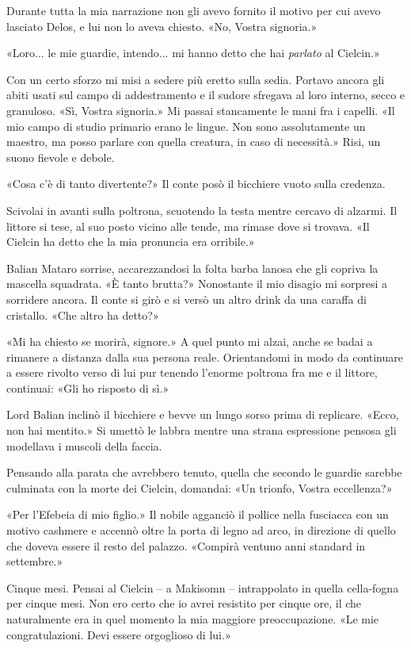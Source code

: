 Durante tutta la mia narrazione non gli avevo fornito il motivo per cui
avevo lasciato Delos, e lui non lo aveva chiesto. «No, Vostra signoria.»

«Loro... le mie guardie, intendo... mi hanno detto che hai
\emph{parlato} al Cielcin.»

Con un certo sforzo mi misi a sedere più eretto sulla sedia. Portavo
ancora gli abiti usati sul campo di addestramento e il sudore sfregava
al loro interno, secco e granuloso. «Sì, Vostra signoria.» Mi passai
stancamente le mani fra i capelli. «Il mio campo di studio primario
erano le lingue. Non sono assolutamente un maestro, ma posso parlare con
quella creatura, in caso di necessità.» Risi, un suono fievole e debole.

«Cosa c'è di tanto divertente?» Il conte posò il bicchiere vuoto sulla
credenza.

Scivolai in avanti sulla poltrona, scuotendo la testa mentre cercavo di
alzarmi. Il littore si tese, al suo posto vicino alle tende, ma rimase
dove si trovava. «Il Cielcin ha detto che la mia pronuncia era
orribile.»

Balian Mataro sorrise, accarezzandosi la folta barba lanosa che gli
copriva la mascella squadrata. «È tanto brutta?» Nonostante il mio
disagio mi sorpresi a sorridere ancora. Il conte si girò e si versò un
altro drink da una caraffa di cristallo. «Che altro ha detto?»

«Mi ha chiesto se morirà, signore.» A quel punto mi alzai, anche se
badai a rimanere a distanza dalla sua persona reale. Orientandomi in
modo da continuare a essere rivolto verso di lui pur tenendo l'enorme
poltrona fra me e il littore, continuai: «Gli ho risposto di sì.»

Lord Balian inclinò il bicchiere e bevve un lungo sorso prima di
replicare. «Ecco, non hai mentito.» Si umettò le labbra mentre una
strana espressione pensosa gli modellava i muscoli della faccia.

Pensando alla parata che avrebbero tenuto, quella che secondo le guardie
sarebbe culminata con la morte dei Cielcin, domandai: «Un trionfo,
Vostra eccellenza?»

«Per l'Efebeia di mio figlio.» Il nobile agganciò il pollice nella
fusciacca con un motivo cashmere e accennò oltre la porta di legno ad
arco, in direzione di quello che doveva essere il resto del palazzo.
«Compirà ventuno anni standard in settembre.»

Cinque mesi. Pensai al Cielcin -- a Makisomn -- intrappolato in quella
cella-fogna per cinque mesi. Non ero certo che io avrei resistito per
cinque ore, il che naturalmente era in quel momento la mia maggiore
preoccupazione. «Le mie congratulazioni. Devi essere orgoglioso di lui.»

